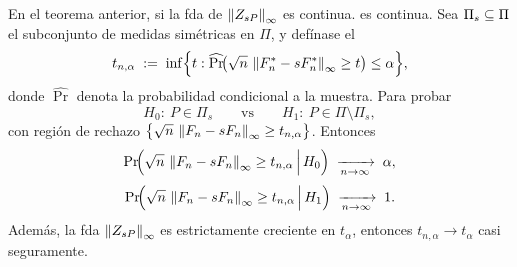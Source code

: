\begin{corolario}
En el teorema anterior,  si la \textup{fda} de $\left\lVert Z_{sP} \right\rVert_\infty$ es continua. es continua.
Sea $\Pi_s \subseteq\Pi$ el subconjunto de medidas simétricas en $\Pi$, y defínase el 
\[
  t_{n,\alpha}\;:=\;\inf\!\Big\{t:\widehat{\Pr}\!\bigl(\sqrt{n}\,\left\lVert F_n^{*}-sF_n^{*} \right\rVert_\infty\ge t\bigr)\le \alpha\Big\},
\]
donde $\widehat{\Pr}$ denota la probabilidad condicional a la muestra.  Para probar
\[
  H_0:\ P\in\Pi_s\qquad\text{vs}\qquad H_1:\ P\in\Pi\setminus\Pi_s,
\]
con región de rechazo $\bigl\{\sqrt{n}\,\left\lVert F_n-sF_n \right\rVert_\infty\ge t_{n,\alpha}\bigr\}$.
Entonces
\[
  \Pr\!\Bigl(\sqrt{n}\,\left\lVert F_n-sF_n \right\rVert_\infty\ge t_{n,\alpha}\,\Big|\,H_0\Bigr)
  \;\xrightarrow[n\to\infty]{}\;\alpha,
\]
\[
  \Pr\!\Bigl(\sqrt{n}\,\left\lVert F_n-sF_n \right\rVert_\infty\ge t_{n,\alpha}\,\Big|\,H_1\Bigr)
  \;\xrightarrow[n\to\infty]{}\;1.
\]
Además, la fda $\left\lVert Z_{sP} \right\rVert_\infty$ es estrictamente creciente en $t_\alpha$, entonces
$t_{n,\alpha}\to t_\alpha$ casi seguramente.
\end{corolario}
